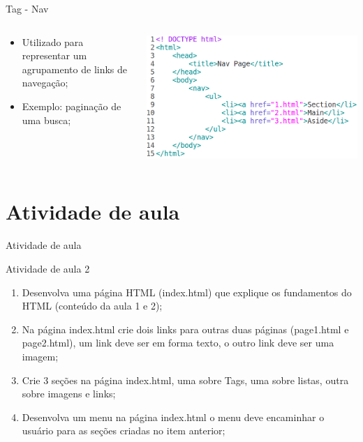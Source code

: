 \documentclass{beamer}
\begin{document}
\begin{frame}{Tag - Nav}
  \begin{columns}
    \begin{column}{0.35 \textwidth}
      \footnotesize
      \begin{itemize}
	\item Utilizado para representar um agrupamento de links de
navegação;
	 \item Exemplo: paginação de uma busca;
      \end{itemize}
    \end{column}
    \begin{column}{0.65\textwidth}
     \includegraphics[height=0.43\paperheight]{fig/aula1/html17.png}
    \end{column}
  \end{columns}
\end{frame}
\section{Atividade de aula}
\begin{frame}{Atividade de aula}
\begin{block}{Atividade de aula 2}
    \begin{enumerate}
        \item Desenvolva uma página HTML (index.html) que explique os fundamentos do HTML (conteúdo da aula 1 e 2);
        \item Na página index.html crie dois links para outras duas páginas (page1.html e page2.html), um link deve ser em forma texto, o outro link deve ser uma imagem;
        \item Crie 3 seções na página index.html, uma sobre Tags, uma sobre listas, outra sobre imagens e links;
        \item Desenvolva um menu na página index.html o menu deve encaminhar o usuário para as seções criadas no item anterior;
    \end{enumerate}
\end{block}
    
\end{frame}
\end{document}
